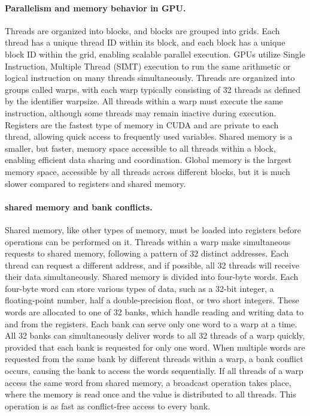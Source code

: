 \paragraph{Parallelism and memory behavior in GPU.} 
Threads are organized into blocks, and blocks are grouped into grids. 
%
Each thread has a unique thread ID within its block, and each block has a unique block ID within the grid, enabling scalable parallel execution.
%
GPUs utilize Single Instruction, Multiple Thread (SIMT) execution to run the same arithmetic or logical instruction on many threads simultaneously.
%
Threads are organized into groups called warps, with each warp typically consisting of 32 threads as defined by the identifier warpsize.
%
All threads within a warp must execute the same instruction, although some threads may remain inactive during execution.
%
Registers are the fastest type of memory in CUDA and are private to each thread, allowing quick access to frequently used variables. 
%
Shared memory is a smaller, but faster, memory space accessible to all threads within a block, enabling efficient data sharing and coordination. 
%
Global memory is the largest memory space, accessible by all threads across different blocks, but it is much slower compared to registers and shared memory.

\paragraph{shared memory and bank conflicts.}
Shared memory, like other types of memory, must be loaded into registers before operations can be performed on it.
%
Threads within a warp make simultaneous requests to shared memory, following a pattern of 32 distinct addresses.
%
Each thread can request a different address, and if possible, all 32 threads will receive their data simultaneously.
%
Shared memory is divided into four-byte words.
%
Each four-byte word can store various types of data, such as a 32-bit integer, a floating-point number, half a double-precision float, or two short integers.
%
These words are allocated to one of 32 banks, which handle reading and writing data to and from the registers.
%
Each bank can serve only one word to a warp at a time.
All 32 banks can simultaneously deliver words to all 32 threads of a warp quickly, provided that each bank is requested for only one word.
%
When multiple words are requested from the same bank by different threads within a warp, a bank conflict occurs, causing the bank to access the words sequentially.
%
If all threads of a warp access the same word from shared memory, a broadcast operation takes place, where the memory is read once and the value is distributed to all threads. 
%
This operation is as fast as conflict-free access to every bank.

